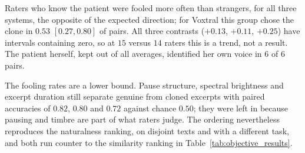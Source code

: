 Raters who know the patient were fooled more often than strangers, for all three
systems, the opposite of the expected direction; for Voxtral this group chose
the clone in $0.53$ $[0.27, 0.80]$ of pairs. All three contrasts ($+0.13$,
$+0.11$, $+0.25$) have intervals containing zero, so at $15$ versus $14$ raters
this is a trend, not a result. The patient herself, kept out of all averages,
identified her own voice in $6$ of $6$ pairs.

The fooling rates are a lower bound. Pause structure, spectral brightness and
excerpt duration still separate genuine from cloned excerpts with paired
accuracies of $0.82$, $0.80$ and $0.72$ against chance $0.50$; they were left in
because pausing and timbre are part of what raters judge. The ordering
nevertheless reproduces the naturalness ranking, on disjoint texts and with a
different task, and both run counter to the similarity ranking in
Table~\ref{tab:objective_results}.
